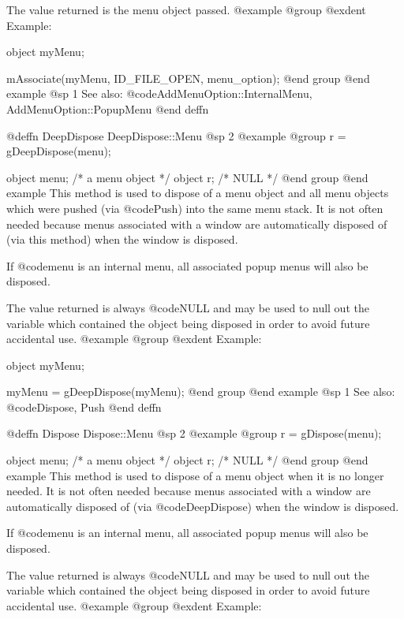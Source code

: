 The value returned is the menu object passed.
@example
@group
@exdent Example:

object  myMenu;

mAssociate(myMenu, ID_FILE_OPEN, menu_option);
@end group
@end example
@sp 1
See also:  @code{AddMenuOption::InternalMenu, AddMenuOption::PopupMenu}
@end deffn








@deffn {DeepDispose} DeepDispose::Menu
@sp 2
@example
@group
r = gDeepDispose(menu);

object  menu;   /*  a menu object    */
object  r;      /*  NULL             */
@end group
@end example
This method is used to dispose of a menu object and all menu objects
which were pushed (via @code{Push}) into the same menu stack.  It is not
often needed because menus associated with a window are automatically
disposed of (via this method) when the window is disposed.

If @code{menu} is an internal menu, all associated popup menus will
also be disposed.

The value returned is always @code{NULL} and may be used to null out
the variable which contained the object being disposed in order to
avoid future accidental use.
@example
@group
@exdent Example:

object  myMenu;

myMenu = gDeepDispose(myMenu);
@end group
@end example
@sp 1
See also:  @code{Dispose, Push}
@end deffn









@deffn {Dispose} Dispose::Menu
@sp 2
@example
@group
r = gDispose(menu);

object  menu;   /*  a menu object   */
object  r;      /*  NULL            */
@end group
@end example
This method is used to dispose of a menu object when it is no longer
needed.  It is not often needed because menus associated with a window
are automatically disposed of (via @code{DeepDispose}) when the window
is disposed.

If @code{menu} is an internal menu, all associated popup menus will
also be disposed.

The value returned is always @code{NULL} and may be used to null out
the variable which contained the object being disposed in order to
avoid future accidental use.
@example
@group
@exdent Example:

